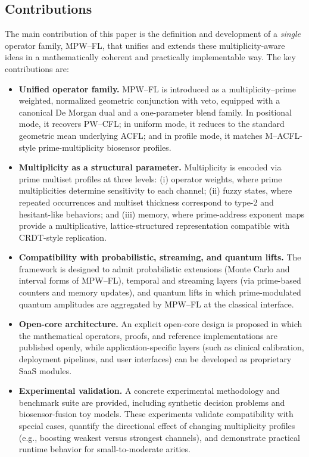 \documentclass[11pt]{article}
\begin{document}
\subsection{Contributions}
\label{subsec:contributions}

The main contribution of this paper is the definition and development of a \emph{single} operator family, MPW--FL, that unifies and extends these multiplicity-aware ideas in a mathematically coherent and practically implementable way. The key contributions are:

\begin{itemize}
  \item \textbf{Unified operator family.} MPW--FL is introduced as a multiplicity–prime weighted, normalized geometric conjunction with veto, equipped with a canonical De Morgan dual and a one-parameter blend family. In positional mode, it recovers PW--CFL; in uniform mode, it reduces to the standard geometric mean underlying ACFL; and in profile mode, it matches M--ACFL-style prime-multiplicity biosensor profiles.

  \item \textbf{Multiplicity as a structural parameter.} Multiplicity is encoded via prime multiset profiles at three levels: (i) operator weights, where prime multiplicities determine sensitivity to each channel; (ii) fuzzy states, where repeated occurrences and multiset thickness correspond to type-2 and hesitant-like behaviors; and (iii) memory, where prime-address exponent maps provide a multiplicative, lattice-structured representation compatible with CRDT-style replication.

  \item \textbf{Compatibility with probabilistic, streaming, and quantum lifts.} The framework is designed to admit probabilistic extensions (Monte Carlo and interval forms of MPW--FL), temporal and streaming layers (via prime-based counters and memory updates), and quantum lifts in which prime-modulated quantum amplitudes are aggregated by MPW--FL at the classical interface.

  \item \textbf{Open-core architecture.} An explicit open-core design is proposed in which the mathematical operators, proofs, and reference implementations are published openly, while application-specific layers (such as clinical calibration, deployment pipelines, and user interfaces) can be developed as proprietary SaaS modules.

  \item \textbf{Experimental validation.} A concrete experimental methodology and benchmark suite are provided, including synthetic decision problems and biosensor-fusion toy models. These experiments validate compatibility with special cases, quantify the directional effect of changing multiplicity profiles (e.g., boosting weakest versus strongest channels), and demonstrate practical runtime behavior for small-to-moderate arities.
\end{itemize}
\end{document}
